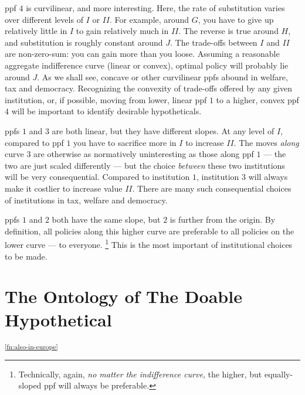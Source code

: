 \gls{ppf} $4$ is curvilinear, and more interesting.
Here, the rate of substitution varies over different levels of $I$ or $II$.
For example, around $G$, you have to give up relatively little in $I$ to gain relatively much in $II$.
The reverse is true around $H$, and substitution is roughly constant around $J$.
The trade-offs between $I$ and $II$ are non-zero-sum:
you can gain more than you loose.
Assuming a reasonable aggregate indifference curve (linear or convex), optimal policy will probably lie around $J$.
As we shall see, concave or other curvilinear \glspl{ppf} abound in welfare, tax and democracy.
Recognizing the convexity of trade-offs offered by any given institution, or, if possible, moving from lower, linear \gls{ppf} $1$ to a higher, convex \gls{ppf} $4$ will be important to identify desirable hypotheticals.%

\glspl{ppf} $1$ and $3$ are both linear, but they have different slopes.
At any level of $I$, compared to \gls{ppf} $1$ you have to sacrifice more in $I$ to increase $II$.
The moves \emph{along} curve $3$ are otherwise as normatively uninteresting as those along \gls{ppf} $1$ --- the two are just scaled differently --- but the choice \emph{between} these two institutions will be very consequential.
Compared to institution $1$, institution $3$ will always make it costlier to increase value $II$.
There are many such consequential choices of institutions in tax, welfare and democracy.

\glspl{ppf} $1$ and $2$ both have the same slope, but $2$ is further from the origin.
By definition, all policies along this higher curve are preferable to all policies on the lower curve --- to everyone.
\footnote{
	Technically, again, \emph{no matter the indifference curve}, the higher, but equally-sloped \gls{ppf} will always be preferable.
}
This is the most important of institutional choices to be made.




\section[Ontology]{The Ontology of The Doable Hypothetical}
	\label{sec:ontology}
\textsuperscript{\ref{fn:also-in-europe}}

